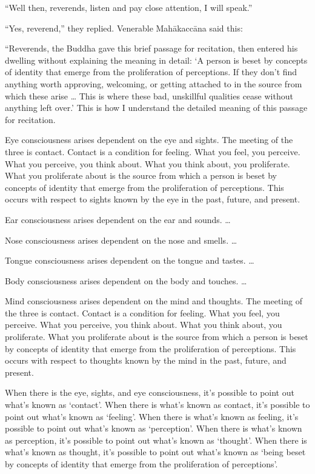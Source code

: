 \documentclass[12pt,openany]{book}%
\begin{document}
“Well then, reverends, listen and pay close attention, I will speak.” 

“Yes, reverend,” they replied. Venerable \textsanskrit{Mahākaccāna} said this: 

“Reverends, the Buddha gave this brief passage for recitation, then entered his dwelling without explaining the meaning in detail: ‘A person is beset by concepts of identity that emerge from the proliferation of perceptions. If they don’t find anything worth approving, welcoming, or getting attached to in the source from which these arise … This is where these bad, unskillful qualities cease without anything left over.’ This is how I understand the detailed meaning of this passage for recitation. 

Eye consciousness arises dependent on the eye and sights. The meeting of the three is contact. Contact is a condition for feeling. What you feel, you perceive. What you perceive, you think about. What you think about, you proliferate. What you proliferate about is the source from which a person is beset by concepts of identity that emerge from the proliferation of perceptions. This occurs with respect to sights known by the eye in the past, future, and present. 

Ear consciousness arises dependent on the ear and sounds. … 

Nose consciousness arises dependent on the nose and smells. … 

Tongue consciousness arises dependent on the tongue and tastes. … 

Body consciousness arises dependent on the body and touches. … 

Mind consciousness arises dependent on the mind and thoughts. The meeting of the three is contact. Contact is a condition for feeling. What you feel, you perceive. What you perceive, you think about. What you think about, you proliferate. What you proliferate about is the source from which a person is beset by concepts of identity that emerge from the proliferation of perceptions. This occurs with respect to thoughts known by the mind in the past, future, and present. 

When there is the eye, sights, and eye consciousness, it’s possible to point out what’s known as ‘contact’. When there is what’s known as contact, it’s possible to point out what’s known as ‘feeling’. When there is what’s known as feeling, it’s possible to point out what’s known as ‘perception’. When there is what’s known as perception, it’s possible to point out what’s known as ‘thought’. When there is what’s known as thought, it’s possible to point out what’s known as ‘being beset by concepts of identity that emerge from the proliferation of perceptions’. 
\end{document}
